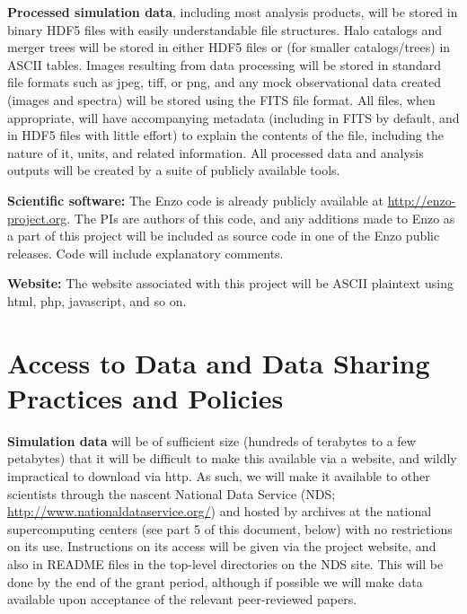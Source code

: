 \documentclass[11pt]{article}
\begin{document}
\vspace{2mm}
\noindent \textbf{Processed simulation data}, including most analysis
products, will be stored in binary HDF5 files with easily
understandable file structures.  Halo catalogs and merger trees will
be stored in either HDF5 files or (for smaller catalogs/trees) in
ASCII tables.  Images resulting from data processing will be stored in
standard file formats such as jpeg, tiff, or png, and any mock
observational data created (images and spectra) will be stored using
the FITS file format.  All files, when appropriate, will have
accompanying metadata (including in FITS by default, and in HDF5 files
with little effort) to explain the contents of the file, including the
nature of it, units, and related information.  All processed data and
analysis outputs will be created by a suite of publicly available
tools.

\vspace{2mm}
\noindent \textbf{Scientific software:} The Enzo code is already
publicly available at \url{http://enzo-project.org}.  The PIs are
authors of this code, and any additions made to Enzo as a part of this
project will be included as source code in one of the Enzo public
releases.  Code will include explanatory comments.

\vspace{2mm}
\noindent \textbf{Website:} The website associated with this project
will be ASCII plaintext using html, php, javascript, and so on.

\vspace{-3mm}
\section{Access to Data and Data Sharing Practices and Policies}
\vspace{-3mm}

\noindent\textbf{Simulation data} will be of sufficient size (hundreds
of terabytes to a few petabytes) that it will be difficult to make
this available via a website, and wildly impractical to download via
http.  As such, we will make it available to other scientists through
the nascent National Data Service (NDS;
\url{http://www.nationaldataservice.org/}) and hosted by archives at
the national supercomputing centers (see part 5 of this document,
below) with no restrictions on its use.  Instructions on its access
will be given via the project website, and also in README files in the
top-level directories on the NDS site.  This will be done by the end
of the grant period, although if possible we will make data available
upon acceptance of the relevant peer-reviewed papers.
\end{document}
